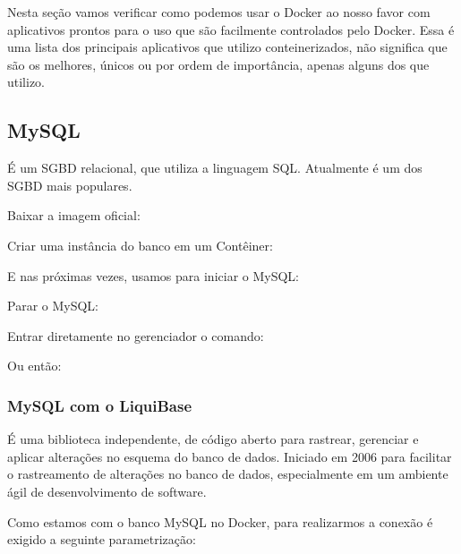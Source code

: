 \documentclass[a4paper,11pt]{article}
\begin{document}
Nesta seção vamos verificar como podemos usar o Docker ao nosso favor com aplicativos prontos para o uso que são facilmente controlados pelo Docker. Essa é uma lista dos principais aplicativos que utilizo conteinerizados, não significa que são os melhores, únicos ou por ordem de importância, apenas alguns dos que utilizo.

\subsection{MySQL}
É um SGBD relacional, que utiliza a linguagem SQL. Atualmente é um dos SGBD mais populares. 

Baixar a imagem oficial: \\

Criar uma instância do banco em um Contêiner: \\

E nas próximas vezes, usamos para iniciar o MySQL: \\

Parar o MySQL: \\

Entrar diretamente no gerenciador o comando: \\

Ou então: \\

\subsubsection{MySQL com o LiquiBase}
É uma biblioteca independente, de código aberto para rastrear, gerenciar e aplicar alterações no esquema do banco de dados. Iniciado em 2006 para facilitar o rastreamento de alterações no banco de dados, especialmente em um ambiente ágil de desenvolvimento de software. 

Como estamos com o banco MySQL no Docker, para realizarmos a conexão é exigido a seguinte parametrização: \\ 
\end{document}
